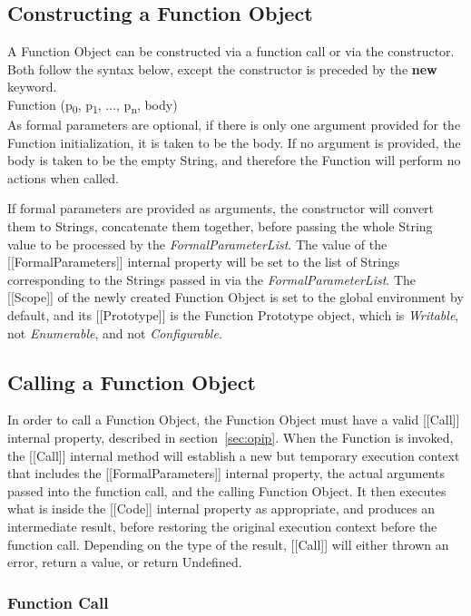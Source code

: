 \documentclass[a4paper,11pt,twoside]{report}
\begin{document}
\subsection{Constructing a Function Object}
A Function Object can be constructed via a function call or via the constructor. Both follow the syntax below, except the constructor is preceded by the \textbf{new} keyword. \\
\indent Function (p\textsubscript{0}, p\textsubscript{1}, ..., p\textsubscript{n}, body) \\
As formal parameters are optional, if there is only one argument provided for the Function initialization, it is taken to be the body. If no argument is provided, the body is taken to be the empty String, and therefore the Function will perform no actions when called.

If formal parameters are provided as arguments, the constructor will convert them to Strings, concatenate them together, before passing the whole String value to be processed by the \textit{FormalParameterList}. The value of the [[FormalParameters]] internal property will be set to the list of Strings corresponding to the Strings passed in via the \textit{FormalParameterList}. The [[Scope]] of the newly created Function Object is set to the global environment by default, and its [[Prototype]] is the Function Prototype object, which is \textit{Writable}, not \textit{Enumerable}, and not \textit{Configurable}.

\subsection{Calling a Function Object}
In order to call a Function Object, the Function Object must have a valid [[Call]] internal property, described in section~\ref{sec:opip}. When the Function is invoked, the [[Call]] internal method will establish a new but temporary execution context that includes the [[FormalParameters]] internal property, the actual arguments passed into the function call, and the calling Function Object. It then executes what is inside the [[Code]] internal property as appropriate, and produces an intermediate result, before restoring the original execution context before the function call. Depending on the type of the result, [[Call]] will either thrown an error, return a value, or return Undefined. 

\subsubsection{Function Call}
\end{document}
